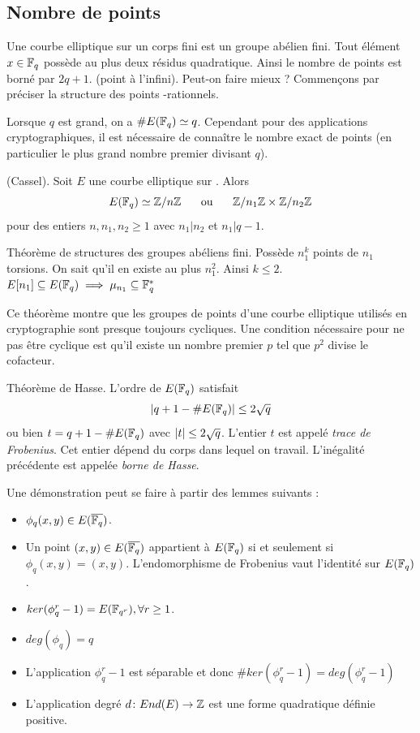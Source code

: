 \subsection{Nombre de points}
Une courbe elliptique sur un corps fini est un groupe abélien fini. Tout élément $x \in \GF{q}$ possède au plus deux résidus quadratique. Ainsi le nombre de points est borné par $2q + 1$. (point à l'infini). Peut-on faire mieux ? Commençons par préciser la structure des points -rationnels.

Lorsque $q$ est grand, on a $\# E(\GF{q}) \simeq q$. Cependant pour des applications cryptographiques, il est nécessaire de connaître le nombre exact de points (en particulier le plus grand nombre premier divisant $q$).

\begin{theoreme}(Cassel). 
Soit $E$ une courbe elliptique sur . Alors 
$$E(\GF{q}) \simeq \Zn{n} \hspace{0.5cm} \text{ ou } \hspace{0.5cm} \Zn{n_1} \times \Zn{n_2}$$
pour des entiers $n, n_1, n_2 \geq 1$ avec $n_1 | n_2$ et $n_1 | q-1$.
\end{theoreme}
\begin{preuve}
Théorème de structures des groupes abéliens fini. Possède $n_{1}^k$ points de $n_1$ torsions. On sait qu'il en existe au plus $n_{1}^2$. Ainsi $k \leq 2$.
$E[n_1] \subseteq E(\GF{q}) \implies \mu_{n_1} \subseteq \GF{q}^{*}$
\end{preuve}
Ce théorème montre que les groupes de points d'une courbe elliptique utilisés en cryptographie sont presque toujours cycliques. Une condition nécessaire pour ne pas être cyclique est qu'il existe un nombre premier $p$ tel que $p^2$ divise le cofacteur.

\begin{theoreme}
Théorème de Hasse. L'ordre de $E(\GF{q})$ satisfait 
$$\abs{q + 1 - \# E(\GF{q})} \leq 2\sqrt{q}$$
ou bien $t = q + 1 - \# E(\GF{q})$ avec $\abs{t} \leq 2 \sqrt{q}$. L'entier $t$ est appelé \emph{trace de Frobenius}. Cet entier dépend du corps dans lequel on travail. L'inégalité précédente est appelée \emph{borne de Hasse}.
\end{theoreme}

Une démonstration peut se faire à partir des lemmes suivants :
\begin{itemize}[label=$\bullet$]
    \item $\phi_q (x, y) \in E(\closure[\GF{q}])$.
    \item Un point $(x, y) \in E(\closure[\GF{q}])$ appartient à $E(\GF{q})$ si et seulement si $\phi_q (x, y) = (x, y)$. L'endomorphisme de Frobenius vaut l'identité sur $E(\GF{q})$.
    \item $ker(\phi_q^r - 1) = E(\GF{q^r}), \forall r \geq 1$.
    \item $deg(\phi_q) = q$
    \item L'application $\phi_q^r - 1$ est séparable et donc $\# ker(\phi_q^r - 1) = deg(\phi_q^r - 1)$
    \item L'application degré $d \colon End(E) \to \Z$ est une forme quadratique définie positive.
\end{itemize}

